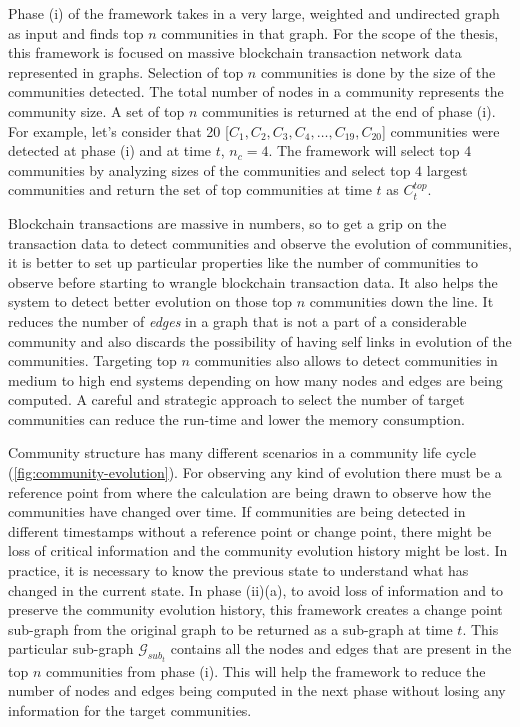 Phase (i) of the framework takes in a very large, weighted and undirected graph as input and finds top $n$ communities in that graph. For the scope of the thesis, this framework is focused on massive blockchain transaction network data represented in graphs. Selection of top $n$ communities is done by the size of the communities detected. The total number of nodes in a community represents the community size. A set of top $n$ communities is returned at the end of phase (i). For example, let's consider that 20 [$C_1, C_2, C_3, C_4, \ldots , C_{19}, C_{20}$] communities were detected at phase (i) and at time $t$, $n_{c} = 4$. The framework will select top $4$ communities by analyzing sizes of the communities and select top $4$ largest communities and return the set of top communities at time  $t$ as $C_t^{top}$. 

Blockchain transactions are massive in numbers, so to get a grip on the transaction data to detect communities and observe the evolution of communities, it is better to set up particular properties like the number of communities to observe before starting to wrangle blockchain transaction data. It also helps the system to detect better evolution on those top $n$ communities down the line. It reduces the number of \textit{edges} in a graph that is not a part of a considerable community and also discards the possibility of having self links in evolution of the communities. Targeting top $n$ communities also allows to detect communities in medium to high end systems depending on how many nodes and edges are being computed. A careful and strategic approach to select the number of target communities can reduce the run-time and lower the memory consumption.

Community structure has many different scenarios in a community life cycle (\ref{fig:community-evolution}). For observing any kind of evolution there must be a reference point from where the calculation are being drawn to observe how the communities have changed over time. If communities are being detected in different timestamps without a reference point or change point, there might be loss of critical information and the community evolution history might be lost. In practice, it is necessary to know the previous state to understand what has changed in the current state. In phase (ii)(a), to avoid loss of information and to preserve the community evolution history, this framework creates a change point sub-graph from the original graph to be returned as a sub-graph at time $t$. This particular sub-graph $\mathcal{G}_{sub_{t}}$ contains all the nodes and edges that are present in the top $n$ communities from phase (i). This will help the framework to reduce the number of nodes and edges being computed in the next phase without losing any information for the target communities.

